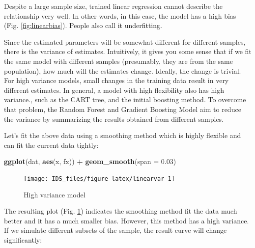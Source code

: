 \documentclass[12pt,]{krantz}
\makeatletter
\newenvironment{Shaded}{\begin{snugshade}}{\end{snugshade}}
\newcommand{\DataTypeTok}[1]{\textcolor[rgb]{0.27,0.27,0.27}{#1}}
\newcommand{\FloatTok}[1]{\textcolor[rgb]{0.06,0.06,0.06}{#1}}
\newcommand{\KeywordTok}[1]{\textcolor[rgb]{0.27,0.27,0.27}{\textbf{#1}}}
\newcommand{\NormalTok}[1]{#1}
\newcommand{\OperatorTok}[1]{\textcolor[rgb]{0.43,0.43,0.43}{\textbf{#1}}}
\newcommand{\StringTok}[1]{\textcolor[rgb]{0.5,0.5,0.5}{#1}}
\newenvironment{kframe}{%
\medskip{}
\setlength{\fboxsep}{.8em}
 \def\at@end@of@kframe{}%
 \ifinner\ifhmode%
  \def\at@end@of@kframe{\end{minipage}}%
  \begin{minipage}{\columnwidth}%
 \fi\fi%
 \def\FrameCommand##1{\hskip\@totalleftmargin \hskip-\fboxsep
 \colorbox{shadecolor}{##1}\hskip-\fboxsep
     \hskip-\linewidth \hskip-\@totalleftmargin \hskip\columnwidth}%
 \MakeFramed {\advance\hsize-\width
   \@totalleftmargin\z@ \linewidth\hsize
   \@setminipage}}%
 {\par\unskip\endMakeFramed%
 \at@end@of@kframe}
\renewenvironment{Shaded}{\begin{kframe}}{\end{kframe}}
\makeatother
\begin{document}
Despite a large sample size, trained linear regression cannot describe the relationship very well. In other words, in this case, the model has a high bias (Fig. \ref{fig:linearbias}). People also call it underfitting.

Since the estimated parameters will be somewhat different for different samples, there is the variance of estimates. Intuitively, it gives you some sense that if we fit the same model with different samples (presumably, they are from the same population), how much will the estimates change. Ideally, the change is trivial. For high variance models, small changes in the training data result in very different estimates. In general, a model with high flexibility also has high variance., such as the CART tree, and the initial boosting method. To overcome that problem, the Random Forest and Gradient Boosting Model aim to reduce the variance by summarizing the results obtained from different samples.

Let's fit the above data using a smoothing method which is highly flexible and can fit the current data tightly:

\begin{Shaded}
\begin{Highlighting}[]
\KeywordTok{ggplot}\NormalTok{(dat, }\KeywordTok{aes}\NormalTok{(x, fx)) }\OperatorTok{+}\StringTok{ }\KeywordTok{geom_smooth}\NormalTok{(}\DataTypeTok{span =} \FloatTok{0.03}\NormalTok{)}
\end{Highlighting}
\end{Shaded}

\begin{figure}

{\centering \texttt{[image: IDS\_files/figure-latex/linearvar-1]} 

}

\caption{High variance model}\label{fig:linearvar}
\end{figure}

The resulting plot (Fig. \ref{fig:linearvar}) indicates the smoothing method fit the data much better and it has a much smaller bias. However, this method has a high variance. If we simulate different subsets of the sample, the result curve will change significantly:
\end{document}
